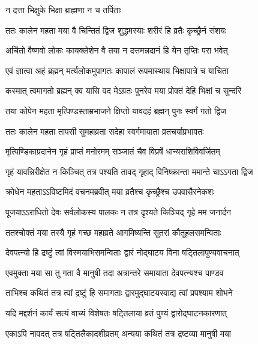 \onelineshloka
{न दत्ता भिक्षुके भिक्षा ब्राह्मणा न च तर्पिताः}%

\twolineshloka
{ततः कालेन महता मया वै चिन्तितं द्विज}
{शुद्धमस्याः शरीरं हि व्रतैः कृच्छ्रैर्न संशयः}%

\twolineshloka
{अर्चितो वैष्णवो लोकः कायक्लेशेन  वै तया}
{न दत्तमन्नदानं हि येन तृप्तिः परा भवेत्}%

\twolineshloka
{एवं ज्ञात्वा अहं ब्रह्मन् मर्त्यलोकमुपागतः}
{कापालं रूपमास्थाय भिक्षापात्रे च याचिता}%

\twolineshloka
{कस्मात् त्वमागतो ब्रह्मन् क्व यासि वद मेऽग्रतः}
{पुनरेव मया प्रोक्तं देहि भिक्षां च सुन्दरि}%

\twolineshloka
{तया कोपेन महता मृत्पिण्डस्ताम्रभाजने}
{क्षिप्तो यावदहं ब्रह्मन् पुनः स्वर्गं गतो द्विज}%

\twolineshloka
{ततः कालेन महता तापसी सुमहाव्रता}
{सदेहा स्वर्गमायाता व्रतचर्याप्रभावतः}%

\twolineshloka
{मृत्पिण्डिकाप्रदानेन गृहं प्राप्तं मनोरमम्}
{सञ्जातं चैव विप्रर्षे धान्यराशिविवर्जितम्}%

\twolineshloka
{गृहं यावन्निरीक्षेत न किञ्चित् तत्र पश्यति}
{तावद् गृहाद् विनिष्क्रान्ता ममान्ते चाऽऽगता द्विज}%

\twolineshloka
{क्रोधेन महताऽऽविष्टमिदं वचनमब्रवीत्}
{मया व्रतैश्च कृच्छ्रैश्च उपवासैरनेकशः}%

\twolineshloka
{पूजयाऽऽराधितो देवः सर्वलोकस्य पालकः}
{न तत्र  दृश्यते किञ्चिद् गृहे मम जनार्दन}%

\twolineshloka
{ततश्चोक्तं मया तस्यै गृहं गच्छ महाव्रते}
{आगमिष्यन्ति सुतरां कौतूहलसमन्विताः}%

\twolineshloka
{देवपत्न्यो हि द्रष्टुं त्वां विस्मयाभिसमन्विताः}
{द्वारं नोद्घाटय विना षट्तिलापुण्यवाचनात्}%

\twolineshloka
{एवमुक्ता मया सा तु गता वै मानुषी तदा}
{अत्रान्तरे समायाता देवपत्न्यश्च पाण्डव}%

\twolineshloka
{ताभिश्च कथितं तत्र त्वां द्रष्टुं हि समागताः}
{द्वारमुद्घाटयस्वाद्य त्वां प्रपश्याम शोभने}%


\twolineshloka
{यदि मद्दर्शनं कार्यं सत्यं वाच्यं विशेषतः}
{षट्तिलाया व्रतं पुण्यं द्वारोद्घाटनकारणात्}%


\twolineshloka
{एकाऽपि नावदत् तत्र षट्तिलैकादशीव्रतम्}
{अन्यया कथितं तत्र द्रष्टव्या मानुषी मया}%

